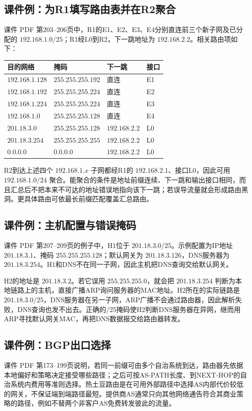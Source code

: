 \subsection{课件例：为R1填写路由表并在R2聚合}
课件 PDF 第203--206页中，R1的E1、E2、E3、E4分别直连前三个新子网及已分配的 $192.168.1.0/25$；R1经L0到R2，下一跳地址为 $192.168.2.2$。相关路由项如下：
\begin{center}\begin{tabular}{llll}\toprule 目的网络 & 掩码 & 下一跳 & 接口\\\midrule
$192.168.1.128$ & $255.255.255.192$ & 直连 & E1\\
$192.168.1.192$ & $255.255.255.224$ & 直连 & E2\\
$192.168.1.224$ & $255.255.255.224$ & 直连 & E3\\
$192.168.1.0$ & $255.255.255.128$ & 直连 & E4\\
$201.18.3.0$ & $255.255.255.128$ & $192.168.2.2$ & L0\\
$201.18.3.254$ & $255.255.255.255$ & $192.168.2.2$ & L0\\
$0.0.0.0$ & $0.0.0.0$ & $192.168.2.2$ & L0\\\bottomrule\end{tabular}\end{center}
R2到达上述四个 $192.168.1.x$ 子网都经R1的 $192.168.2.1$、接口L0，因此可用 $192.168.1.0/24$ 聚合。能聚合的条件是地址前缀连续、下一跳和输出接口相同，而且汇总后不把本来不可达的地址错误地指向该下一跳；若误导流量就会形成路由黑洞。更具体路由可依最长前缀匹配覆盖汇总路由。\annotationarea[4]

\subsection{课件例：主机配置与错误掩码}
课件 PDF 第207--209页的例子中，H1位于 $201.18.3.0/25$。示例配置为IP地址 $201.18.3.1$、掩码 $255.255.255.128$；默认网关为 $201.18.3.126$，DNS服务器为 $201.18.3.254$。H1和DNS不在同一子网，因此主机把DNS查询交给默认网关。\par
H2的地址是 $201.18.3.2$。若它误用 $255.255.255.0$，就会把 $201.18.3.254$ 判断为本地链路上的主机，直接广播ARP询问服务器的MAC地址。H2所在的实际链路是 $201.18.3.0/25$，DNS服务器在另一子网，ARP广播不会通过路由器，因此解析失败，DNS查询也发不出去。正确的/25掩码使H2判断DNS服务器在异网，继而用ARP寻找默认网关MAC，再把DNS数据报交给路由器转发。\annotationarea[4]

\subsection{课件例：BGP出口选择}
课件 PDF 第173--199页说明，若同一前缀可由多个自治系统到达，路由器先依据本地偏好和策略决定接受哪些路径；之后可按AS-PATH长度、到NEXT-HOP的自治系统内费用等准则选择。热土豆路由是在可用外部路径中选择AS内部代价较低的网关，不保证端到端路径最短。提供商AS通常只向其他网络通告符合其商业策略的路径，例如不替两个非客户AS免费转发彼此的流量。\annotationarea[4]

